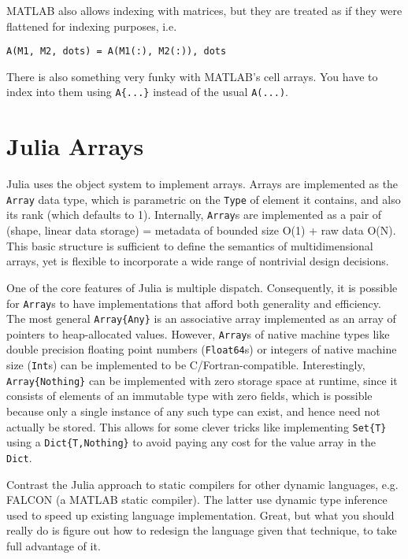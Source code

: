 \documentclass[preprint]{sigplanconf}
\newcommand{\MATLAB}{\textsc{MATLAB}}
\newcommand{\code}[1]{\texttt{#1}}
\begin{document}
\MATLAB{} also allows indexing with matrices, but they are treated as if they
were flattened for indexing purposes, i.e.
\begin{verbatim}
A(M1, M2, dots) = A(M1(:), M2(:)), dots
\end{verbatim}

There is also something very funky with \MATLAB's cell arrays. You have to
index into them using \texttt{A\{...\}} instead of the usual \texttt{A(...)}.



\section{Julia Arrays}

Julia uses the object system to implement arrays. Arrays are implemented as
the \code{Array} data type, which is parametric on the \code{Type} of element
it contains, and also its rank (which defaults to 1). Internally,
\code{Array}s are implemented as a pair of (shape, linear data storage) =
metadata of bounded size O(1) + raw data O(N). This basic structure is
sufficient to define the semantics of multidimensional arrays, yet is flexible
to incorporate a wide range of nontrivial design decisions.

One of the core features of Julia is multiple dispatch. Consequently, it is
possible for \code{Array}s to have implementations that afford both generality
and efficiency. The most general \code{Array\{Any\}} is an associative array
implemented as an array of pointers to heap-allocated values. However,
\code{Array}s of native machine types like double precision floating point
numbers (\code{Float64}s) or integers of native machine size (\code{Int}s) can
be implemented to be C/Fortran-compatible. Interestingly,
\code{Array\{Nothing\}} can be implemented with zero storage space at runtime,
since it consists of elements of an immutable type with zero fields, which is
possible because only a single instance of any such type can exist, and hence
need not actually be stored. This allows for some clever tricks like
implementing \code{Set\{T\}} using a \code{Dict\{T,Nothing\}} to avoid paying
any cost for the value array in the \code{Dict}.

Contrast the Julia approach to static compilers for other dynamic languages,
e.g. FALCON (a \MATLAB{} static compiler). The latter use dynamic type
inference used to speed up existing language implementation. Great, but what
you should really do is figure out how to redesign the language given that
technique, to take full advantage of it.
\end{document}
